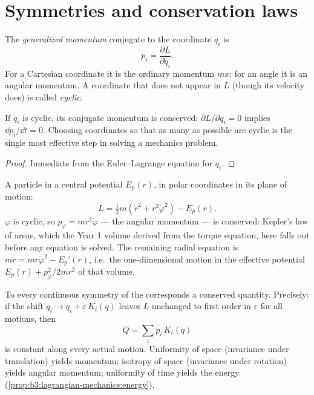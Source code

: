 \section{Symmetries and conservation laws}

\begin{definition}\label{def:b3:lagrangian-mechanics:momentum}
The \emph{generalized momentum} conjugate to the coordinate $q_i$ is
\[
p_i = \frac{\partial L}{\partial\dot q_i} .
\]
For a Cartesian coordinate it is the ordinary momentum $m\dot x$; for
an angle it is an angular momentum. A coordinate that does not appear
in $L$ (though its velocity does) is called \emph{cyclic}.
\end{definition}

\begin{proposition}\label{prop:b3:lagrangian-mechanics:cyclic}
If $q_i$ is cyclic, its conjugate momentum is conserved:
$\partial L/\partial q_i = 0$ implies $\dd p_i/\dd t = 0$. Choosing
coordinates so that as many as possible are cyclic is the single most
effective step in solving a mechanics problem.
\end{proposition}

\begin{proof}
Immediate from the Euler--Lagrange equation for $q_i$.
\end{proof}

\begin{example}\label{ex:b3:lagrangian-mechanics:central}
A particle in a central potential $E_p(r)$, in polar coordinates in its
plane of motion:
\[
L = \tfrac12 m(\dot r^2 + r^2\dot\varphi^2) - E_p(r) .
\]
$\varphi$ is cyclic, so $p_\varphi = mr^2\dot\varphi$ --- the angular
momentum --- is conserved: Kepler's law of areas, which the Year 1
volume derived from the torque equation, here falls out before any
equation is solved. The remaining radial equation is
$m\ddot r = mr\dot\varphi^2 - E_p'(r)$, i.e.\ the one-dimensional
motion in the effective potential $E_p(r) + p_\varphi^2/2mr^2$ of that
volume.
\end{example}

\begin{theorem}\label{thm:b3:lagrangian-mechanics:noether}
To every continuous symmetry of the  corresponds a conserved
quantity. Precisely: if the shift $q_i \to q_i + \varepsilon\,K_i(q)$
leaves $L$ unchanged to first order in $\varepsilon$ for all motions,
then
\[
Q = \sum_i p_i\,K_i(q)
\]
is constant along every actual motion. Uniformity of space (invariance
under translation) yields momentum; isotropy of space (invariance under
rotation) yields angular momentum; uniformity of time yields the energy
(\cref{prop:b3:lagrangian-mechanics:energy}).
\end{theorem}

